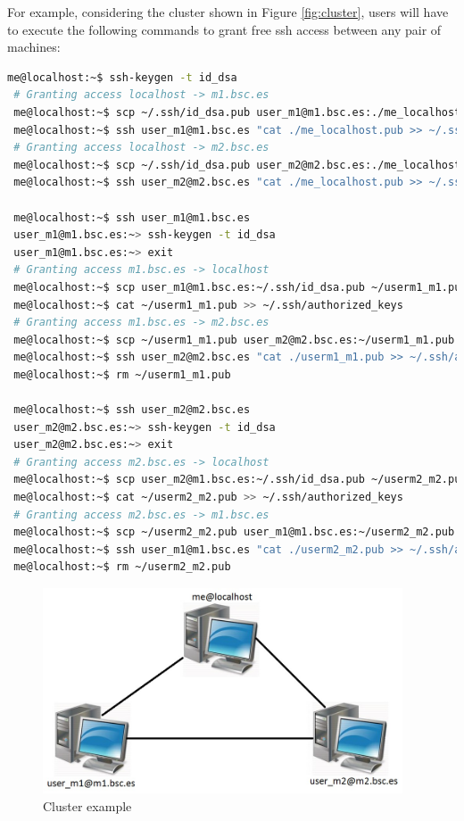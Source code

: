 For example, considering the cluster shown in Figure \ref{fig:cluster}, users will have to execute the following commands
to grant free ssh access between any pair of machines:
\begin{lstlisting}[language=bash]
 me@localhost:~$ ssh-keygen -t id_dsa
 # Granting access localhost -> m1.bsc.es
 me@localhost:~$ scp ~/.ssh/id_dsa.pub user_m1@m1.bsc.es:./me_localhost.pub
 me@localhost:~$ ssh user_m1@m1.bsc.es "cat ./me_localhost.pub >> ~/.ssh/authorized_keys; rm ./me_localhost.pub"
 # Granting access localhost -> m2.bsc.es
 me@localhost:~$ scp ~/.ssh/id_dsa.pub user_m2@m2.bsc.es:./me_localhost.pub
 me@localhost:~$ ssh user_m2@m2.bsc.es "cat ./me_localhost.pub >> ~/.ssh/authorized_keys; rm ./me_localhost.pub"
 
 me@localhost:~$ ssh user_m1@m1.bsc.es
 user_m1@m1.bsc.es:~> ssh-keygen -t id_dsa
 user_m1@m1.bsc.es:~> exit
 # Granting access m1.bsc.es -> localhost
 me@localhost:~$ scp user_m1@m1.bsc.es:~/.ssh/id_dsa.pub ~/userm1_m1.pub
 me@localhost:~$ cat ~/userm1_m1.pub >> ~/.ssh/authorized_keys
 # Granting access m1.bsc.es -> m2.bsc.es
 me@localhost:~$ scp ~/userm1_m1.pub user_m2@m2.bsc.es:~/userm1_m1.pub 
 me@localhost:~$ ssh user_m2@m2.bsc.es "cat ./userm1_m1.pub >> ~/.ssh/authorized_keys; rm ./userm1_m1.pub"
 me@localhost:~$ rm ~/userm1_m1.pub
 
 me@localhost:~$ ssh user_m2@m2.bsc.es
 user_m2@m2.bsc.es:~> ssh-keygen -t id_dsa
 user_m2@m2.bsc.es:~> exit
 # Granting access m2.bsc.es -> localhost
 me@localhost:~$ scp user_m2@m1.bsc.es:~/.ssh/id_dsa.pub ~/userm2_m2.pub
 me@localhost:~$ cat ~/userm2_m2.pub >> ~/.ssh/authorized_keys
 # Granting access m2.bsc.es -> m1.bsc.es
 me@localhost:~$ scp ~/userm2_m2.pub user_m1@m1.bsc.es:~/userm2_m2.pub 
 me@localhost:~$ ssh user_m1@m1.bsc.es "cat ./userm2_m2.pub >> ~/.ssh/authorized_keys; rm ./userm2_m2.pub"
 me@localhost:~$ rm ~/userm2_m2.pub
\end{lstlisting}

\begin{figure}[h!]
  \centering
    \includegraphics[width=0.95\textwidth]{./Sections/5_Additional_Configuration/Figures/cluster.jpeg}
    \caption{Cluster example}
\end{figure}
\label{fig:cluster}

